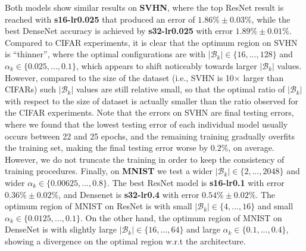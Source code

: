 \documentclass[10pt,journal,compsoc]{IEEEtran}
\begin{document}
Both models show similar results on {\bf SVHN}, where the top ResNet result is reached with {\bf s16-lr0.025} that produced an error of $1.86\%\pm0.03\%$, while the best DenseNet accuracy is achieved by {\bf s32-lr0.025} with error $1.89\%\pm0.01\%$. %
Compared to CIFAR experiments, it is clear that the optimum region on SVHN is ``thinner'', where 
the optimal configurations are with $|\mathcal{B}_k| \in \{ 16, ..., 128 \}$ and $\alpha_k \in \{ 0.025, ..., 0.1 \}$, which appears to shift noticeably towards larger $|\mathcal{B}_k|$ values.
However, compared to the size of the dataset (i.e., SVHN is 10$\times$ larger than CIFARs) such $|\mathcal{B}_k|$ values are still relative small, so that the optimal ratio of $|\mathcal{B}_k|$ with respect to the size of dataset is actually smaller than the ratio observed for the CIFAR experiments.
Note that the errors on SVHN are final testing errors, where we found that the lowest testing error of each individual model  usually occurs between 22 and 25 epochs, and the remaining training gradually overfits the training set, making the final testing error worse by $0.2\%$, on average.
However, we do not truncate the training in order to keep the consistency of training procedures.
Finally, on {\bf MNIST} we test a wider  $|\mathcal{B}_k| \in \{ 2, ..., 2048 \}$ and wider  $\alpha_k \in \{ 0.00625, ..., 0.8 \}$.
The best ResNet model is {\bf s16-lr0.1} with error $0.36\%\pm0.02\%$, and Densenet is {\bf s32-lr0.4} with error $0.54\%\pm0.02\%$.
The optimum region of MNIST on ResNet is with small $|\mathcal{B}_k| \in \{ 4, ..., 16 \}$ and small $\alpha_k \in \{ 0.0125, ..., 0.1 \}$.
On the other hand, the optimum region of MNIST on DenseNet is with slightly large $|\mathcal{B}_k| \in \{ 16, ..., 64 \}$ and large $\alpha_k \in \{ 0.1, ..., 0.4 \}$, showing a divergence on the optimal region w.r.t the architecture.
\end{document}
